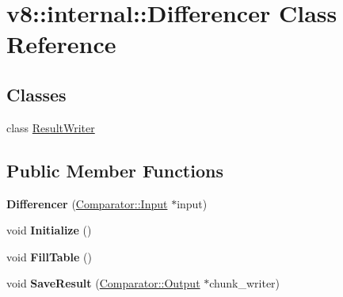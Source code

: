 \hypertarget{classv8_1_1internal_1_1_differencer}{}\section{v8\+:\+:internal\+:\+:Differencer Class Reference}
\label{classv8_1_1internal_1_1_differencer}
\subsection*{Classes}
\begin{DoxyCompactItemize}
\item 
class \hyperlink{classv8_1_1internal_1_1_differencer_1_1_result_writer}{Result\+Writer}
\end{DoxyCompactItemize}
\subsection*{Public Member Functions}
\begin{DoxyCompactItemize}
\item 
{\bfseries Differencer} (\hyperlink{classv8_1_1internal_1_1_comparator_1_1_input}{Comparator\+::\+Input} $\ast$input)\hypertarget{classv8_1_1internal_1_1_differencer_a1b5fd7095c8e88a767f3b70588ef280f}{}\label{classv8_1_1internal_1_1_differencer_a1b5fd7095c8e88a767f3b70588ef280f}

\item 
void {\bfseries Initialize} ()\hypertarget{classv8_1_1internal_1_1_differencer_a859b793f1857bd6102101001afc1b7a9}{}\label{classv8_1_1internal_1_1_differencer_a859b793f1857bd6102101001afc1b7a9}

\item 
void {\bfseries Fill\+Table} ()\hypertarget{classv8_1_1internal_1_1_differencer_aebab5489905a379f5435ba6b47d6bba6}{}\label{classv8_1_1internal_1_1_differencer_aebab5489905a379f5435ba6b47d6bba6}

\item 
void {\bfseries Save\+Result} (\hyperlink{classv8_1_1internal_1_1_comparator_1_1_output}{Comparator\+::\+Output} $\ast$chunk\+\_\+writer)\hypertarget{classv8_1_1internal_1_1_differencer_a7c42ce28fa7cad5218ec9b5221924962}{}\label{classv8_1_1internal_1_1_differencer_a7c42ce28fa7cad5218ec9b5221924962}

\end{DoxyCompactItemize}
